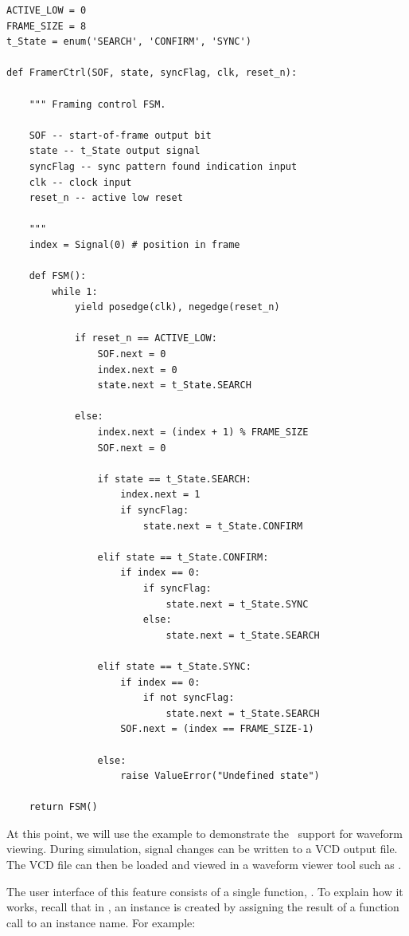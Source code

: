 \begin{verbatim}
ACTIVE_LOW = 0
FRAME_SIZE = 8
t_State = enum('SEARCH', 'CONFIRM', 'SYNC')

def FramerCtrl(SOF, state, syncFlag, clk, reset_n):
    
    """ Framing control FSM.

    SOF -- start-of-frame output bit
    state -- t_State output signal
    syncFlag -- sync pattern found indication input
    clk -- clock input
    reset_n -- active low reset
    
    """
    index = Signal(0) # position in frame

    def FSM():
        while 1:
            yield posedge(clk), negedge(reset_n)
            
            if reset_n == ACTIVE_LOW:
                SOF.next = 0
                index.next = 0
                state.next = t_State.SEARCH

            else:
                index.next = (index + 1) % FRAME_SIZE
                SOF.next = 0

                if state == t_State.SEARCH:
                    index.next = 1
                    if syncFlag:
                        state.next = t_State.CONFIRM

                elif state == t_State.CONFIRM:
                    if index == 0:
                        if syncFlag:
                            state.next = t_State.SYNC
                        else:
                            state.next = t_State.SEARCH

                elif state == t_State.SYNC:
                    if index == 0:
                        if not syncFlag:
                            state.next = t_State.SEARCH
                    SOF.next = (index == FRAME_SIZE-1)

                else:
                    raise ValueError("Undefined state")

    return FSM()
\end{verbatim}

At this point, we will use the example to demonstrate
the \myhdl\ support for 
%
waveform viewing.
During simulation, signal
changes can be written to a VCD output file.  The VCD file can then be
loaded and viewed in a waveform viewer tool such as .

The user interface of this feature consists of a single function,
.  To explain how it works, recall that in
\myhdl{}, an instance is created by assigning
the result of a function call to an instance name.
For example:

